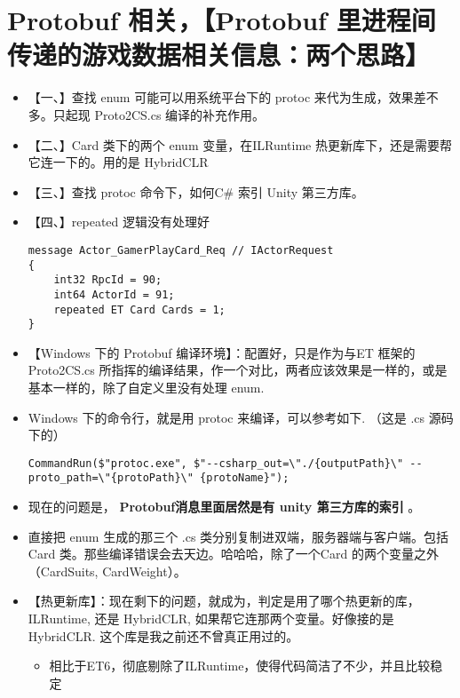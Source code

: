 \documentclass[9pt, b5paper]{article}
\begin{document}
\section{Protobuf 相关，【Protobuf 里进程间传递的游戏数据相关信息：两个思路】}
\label{sec-12}
\begin{itemize}
\item 【一、】查找 enum 可能可以用系统平台下的 protoc 来代为生成，效果差不多。只起现 Proto2CS.cs 编译的补充作用。
\item 【二、】Card 类下的两个 enum 变量，在ILRuntime 热更新库下，还是需要帮它连一下的。用的是 HybridCLR
\item 【三、】查找 protoc 命令下，如何C\# 索引 Unity 第三方库。
\item 【四、】repeated 逻辑没有处理好
\begin{verbatim}
message Actor_GamerPlayCard_Req // IActorRequest
{
	int32 RpcId = 90;
	int64 ActorId = 91;
    repeated ET Card Cards = 1;
}
\end{verbatim}
\item 【Windows 下的 Protobuf 编译环境】：配置好，只是作为与ET 框架的Proto2CS.cs 所指挥的编译结果，作一个对比，两者应该效果是一样的，或是基本一样的，除了自定义里没有处理 enum.
\item Windows 下的命令行，就是用 protoc 来编译，可以参考如下. （这是 .cs 源码下的）
\begin{verbatim}
CommandRun($"protoc.exe", $"--csharp_out=\"./{outputPath}\" --proto_path=\"{protoPath}\" {protoName}");
\end{verbatim}
\item 现在的问题是， \textbf{Protobuf消息里面居然是有 unity 第三方库的索引} 。
\item 直接把 enum 生成的那三个 .cs 类分别复制进双端，服务器端与客户端。包括Card 类。那些编译错误会去天边。哈哈哈，除了一个Card 的两个变量之外（CardSuits, CardWeight）。
\item 【热更新库】：现在剩下的问题，就成为，判定是用了哪个热更新的库，ILRuntime, 还是 HybridCLR, 如果帮它连那两个变量。好像接的是 HybridCLR. 这个库是我之前还不曾真正用过的。
\begin{itemize}
\item 相比于ET6，彻底剔除了ILRuntime，使得代码简洁了不少，并且比较稳定
\end{itemize}
\end{itemize}
\end{document}
